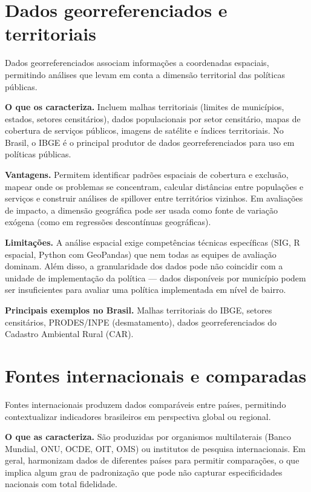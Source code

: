\section{Dados georreferenciados e territoriais}

Dados georreferenciados associam informações a coordenadas espaciais, permitindo análises que levam em conta a dimensão territorial das políticas públicas.

\textbf{O que os caracteriza.} Incluem malhas territoriais (limites de municípios, estados, setores censitários), dados populacionais por setor censitário, mapas de cobertura de serviços públicos, imagens de satélite e índices territoriais. No Brasil, o IBGE é o principal produtor de dados georreferenciados para uso em políticas públicas.

\textbf{Vantagens.} Permitem identificar padrões espaciais de cobertura e exclusão, mapear onde os problemas se concentram, calcular distâncias entre populações e serviços e construir análises de spillover entre territórios vizinhos. Em avaliações de impacto, a dimensão geográfica pode ser usada como fonte de variação exógena (como em regressões descontínuas geográficas).

\textbf{Limitações.} A análise espacial exige competências técnicas específicas (SIG, R espacial, Python com GeoPandas) que nem todas as equipes de avaliação dominam. Além disso, a granularidade dos dados pode não coincidir com a unidade de implementação da política — dados disponíveis por município podem ser insuficientes para avaliar uma política implementada em nível de bairro.

\textbf{Principais exemplos no Brasil.} Malhas territoriais do IBGE, setores censitários, PRODES/INPE (desmatamento), dados georreferenciados do Cadastro Ambiental Rural (CAR).

\section{Fontes internacionais e comparadas}

Fontes internacionais produzem dados comparáveis entre países, permitindo contextualizar indicadores brasileiros em perspectiva global ou regional.

\textbf{O que as caracteriza.} São produzidas por organismos multilaterais (Banco Mundial, ONU, OCDE, OIT, OMS) ou institutos de pesquisa internacionais. Em geral, harmonizam dados de diferentes países para permitir comparações, o que implica algum grau de padronização que pode não capturar especificidades nacionais com total fidelidade.

